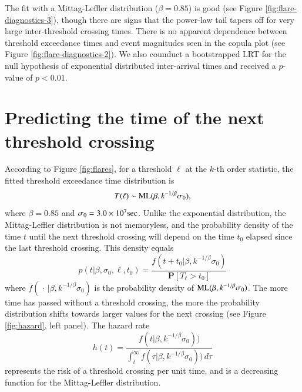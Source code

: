 \documentclass[]{elsarticle} %
\begin{document}
The fit with a Mittag-Leffler distribution (\(\beta = 0.85\)) is good
(see Figure \ref{fig:flare-diagnostics-3}), though there are signs that
the power-law tail tapers off for very large inter-threshold crossing
times. There is no apparent dependence between threshold exceedance
times and event magnitudes seen in the copula plot (see Figure
\ref{fig:flare-diagnostics-2}). We also counduct a bootstrapped LRT for
the null hypothesis of exponential distributed inter-arrival times and
received a \(p\)-value of \(p<0.01\).

\hypertarget{predicting-the-time-of-the-next-threshold-crossing}{%
\section{Predicting the time of the next threshold
crossing}\label{predicting-the-time-of-the-next-threshold-crossing}}

According to Figure \ref{fig:flares}, for a threshold \(\ell\) at the
\(k\)-th order statistic, the fitted threshold exceedance time
distribution is \[
T(\ell) \sim {\rm ML}(\beta, k^{-1/\beta} \sigma_0), 
\] where \(\beta = 0.85\) and \(\sigma_0 = 3.0 \times 10^7 {\rm sec}\).
Unlike the exponential distribution, the Mittag-Leffler distribution is
not memoryless, and the probability density of the time \(t\) until the
next threshold crossing will depend on the time \(t_0\) elapsed since
the last threshold crossing. This density equals \[
p(t|\beta, \sigma_0, \ell, t_0) = \frac{f(t + t_0 | \beta, k^{-1/\beta} \sigma_0)}{\mathbf P[T_\ell > t_0]}
\] where \(f(\,\cdot\, | \beta, k^{-1/\beta} \sigma_0)\) is the
probability density of \({\rm ML}(\beta, k^{-1/\beta} \sigma_0)\). The
more time has passed without a threshold crossing, the more the
probability distribution shifts towards larger values for the next
crossing (see Figure \ref{fig:hazard}, left panel). The hazard rate \[
h(t) = \frac{f(t| \beta, k^{-1/\beta} \sigma_0))}{\int_t^\infty f(\tau| \beta, k^{-1/\beta} \sigma_0))\,d\tau}
\] represents the risk of a threshold crossing per unit time, and is a
decreasing function for the Mittag-Leffler distribution.
\end{document}

